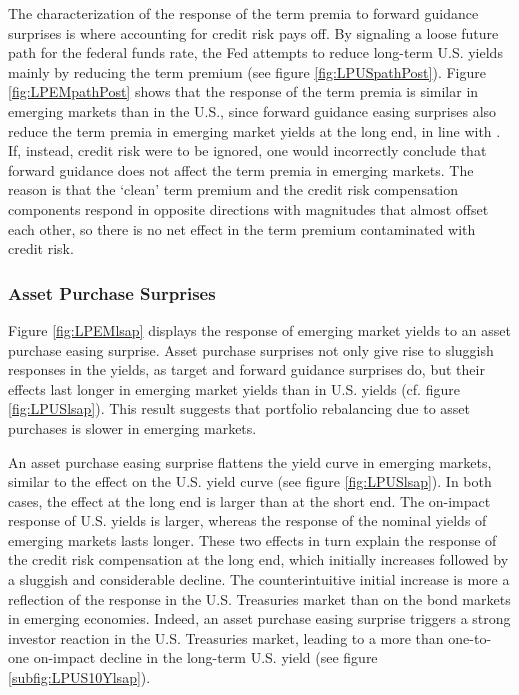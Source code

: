 \documentclass[a4paper, 12pt]{article}
\begin{document}
The characterization of the response of the term premia to forward guidance surprises is where accounting for credit risk pays off. By signaling a loose future path for the federal funds rate, the Fed attempts to reduce long-term U.S. yields mainly by reducing the term premium (see figure \ref{fig:LPUSpathPost}). Figure \ref{fig:LPEMpathPost} shows that the response of the term premia is similar in emerging markets than in the U.S., since forward guidance easing surprises also reduce the term premia in emerging market yields at the long end, in line with \cite{Turner:2014}. If, instead, credit risk were to be ignored, one would incorrectly conclude that forward guidance does not affect the term premia in emerging markets. The reason is that the `clean' term premium and the credit risk compensation components respond in opposite directions with magnitudes that almost offset each other, so there is no net effect in the term premium contaminated with credit risk.

\subsubsection{Asset Purchase Surprises}
Figure \ref{fig:LPEMlsap} displays the response of emerging market yields to an asset purchase easing surprise. Asset purchase surprises not only give rise to sluggish responses in the yields, as target and forward guidance surprises do, but their effects last longer in emerging market yields than in U.S. yields (cf. figure \ref{fig:LPUSlsap}). This result suggests that portfolio rebalancing due to asset purchases is slower in emerging markets.

An asset purchase easing surprise flattens the yield curve in emerging markets, similar to the effect on the U.S. yield curve (see figure \ref{fig:LPUSlsap}). In both cases, the effect at the long end is larger than at the short end. The on-impact response of U.S. yields is larger, whereas the response of the nominal yields of emerging markets lasts longer. These two effects in turn explain the response of the credit risk compensation at the long end, which initially increases followed by a sluggish and considerable decline. The counterintuitive initial increase is more a reflection of the response in the U.S. Treasuries market than on the bond markets in emerging economies. Indeed, an asset purchase easing surprise triggers a strong investor reaction in the U.S. Treasuries market, leading to a  more than one-to-one on-impact decline in the long-term U.S. yield (see figure \ref{subfig:LPUS10Ylsap}). 
\end{document}

